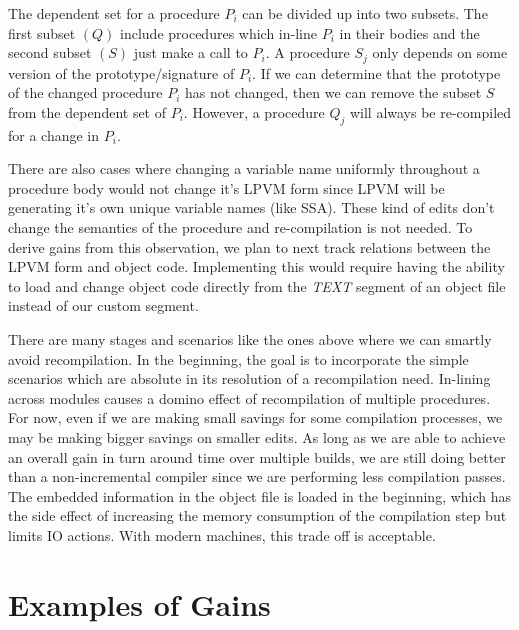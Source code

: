 The dependent set for a procedure $P_i$ can be divided up into two subsets. The
first subset $(Q)$ include procedures which in-line $P_i$ in their bodies and
the second subset $(S)$ just make a call to $P_i$. A procedure $S_j$ only
depends on some version of the prototype/signature of $P_i$. If we can
determine that the prototype of the changed procedure $P_i$ has not changed,
then we can remove the subset $S$ from the dependent set of $P_i$. However, a
procedure $Q_j$ will always be re-compiled for a change in $P_i$.

There are also cases where changing a variable name uniformly throughout a
procedure body would not change it's LPVM form since LPVM will be generating
it's own unique variable names (like SSA). These kind of edits don't change the
semantics of the procedure and re-compilation is not needed. To derive gains
from this observation, we plan to next track relations between the LPVM form
and object code. Implementing this would require having the ability to load and
change object code directly from the \textit{TEXT} segment of an object file
instead of our custom segment. 

There are many stages and scenarios like the ones above where we can smartly
avoid recompilation. In the beginning, the goal is to incorporate the simple
scenarios which are absolute in its resolution of a recompilation
need. In-lining across modules causes a domino effect of recompilation of
multiple procedures. For now, even if we are making small savings for some
compilation processes, we may be making bigger savings on smaller edits. As
long as we are able to achieve an overall gain in turn around time over
multiple builds, we are still doing better than a non-incremental compiler
since we are performing less compilation passes. The embedded information in
the object file is loaded in the beginning, which has the side effect of
increasing the memory consumption of the compilation step but limits IO
actions. With modern machines, this trade off is acceptable.

\section{Examples of Gains}

